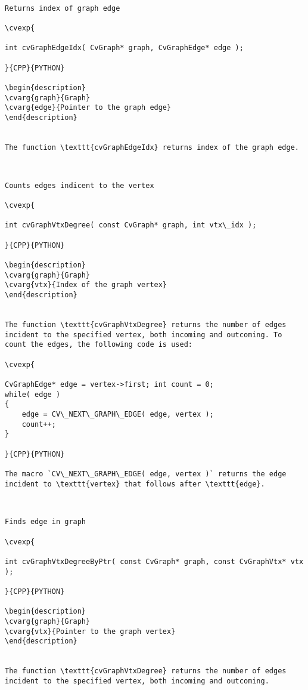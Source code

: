 \begin{verbatim}

Returns index of graph edge

\cvexp{

int cvGraphEdgeIdx( CvGraph* graph, CvGraphEdge* edge );

}{CPP}{PYTHON}

\begin{description}
\cvarg{graph}{Graph}
\cvarg{edge}{Pointer to the graph edge}
\end{description}


The function \texttt{cvGraphEdgeIdx} returns index of the graph edge.


\end{verbatim}
\begin{verbatim}

Counts edges indicent to the vertex

\cvexp{

int cvGraphVtxDegree( const CvGraph* graph, int vtx\_idx );

}{CPP}{PYTHON}

\begin{description}
\cvarg{graph}{Graph}
\cvarg{vtx}{Index of the graph vertex}
\end{description}


The function \texttt{cvGraphVtxDegree} returns the number of edges incident to the specified vertex, both incoming and outcoming. To count the edges, the following code is used:

\cvexp{

CvGraphEdge* edge = vertex->first; int count = 0;
while( edge )
{
    edge = CV\_NEXT\_GRAPH\_EDGE( edge, vertex );
    count++;
}

}{CPP}{PYTHON}

The macro `CV\_NEXT\_GRAPH\_EDGE( edge, vertex )` returns the edge incident to \texttt{vertex} that follows after \texttt{edge}.


\end{verbatim}
\begin{verbatim}

Finds edge in graph

\cvexp{

int cvGraphVtxDegreeByPtr( const CvGraph* graph, const CvGraphVtx* vtx );

}{CPP}{PYTHON}

\begin{description}
\cvarg{graph}{Graph}
\cvarg{vtx}{Pointer to the graph vertex}
\end{description}


The function \texttt{cvGraphVtxDegree} returns the number of edges incident to the specified vertex, both incoming and outcoming.


\end{verbatim}
